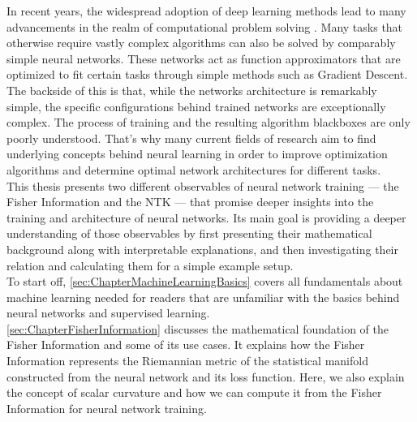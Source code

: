 In recent years, the widespread adoption of deep learning methods lead to many advancements in the realm of computational problem solving \cite{DeepLearning:DNA,DeepLearning:DrugRecognition,DeepLearning:ImageNetClassification,DeepLearning:Translation}. Many tasks that otherwise require vastly complex algorithms can also be solved by comparably simple neural networks. These networks act as function approximators that are optimized to fit certain tasks through simple methods such as Gradient Descent. The backside of this is that, while the networks architecture is remarkably simple, the specific configurations behind trained networks are exceptionally complex. The process of training and the resulting algorithm blackboxes are only poorly understood. That's why many current fields of research aim to find underlying concepts behind neural learning \cite{InterpretableAI} in order to improve optimization algorithms and determine optimal network architectures for different tasks.\\
This thesis presents two different observables of neural network training --- the Fisher Information and the NTK --- that promise deeper insights into the training and architecture of neural networks. Its main goal is providing a deeper understanding of those observables by first presenting their mathematical background along with interpretable explanations, and then investigating their relation and calculating them for a simple example setup.\\
To start off, \cref{sec:ChapterMachineLearningBasics} covers all fundamentals about machine learning needed for readers that are unfamiliar with the basics behind neural networks and supervised learning.\\
\cref{sec:ChapterFisherInformation} discusses the mathematical foundation of the Fisher Information and some of its use cases. It explains how the Fisher Information represents the Riemannian metric of the statistical manifold constructed from the neural network and its loss function. Here, we also explain the concept of scalar curvature and how we can compute it from the Fisher Information for neural network training. %
